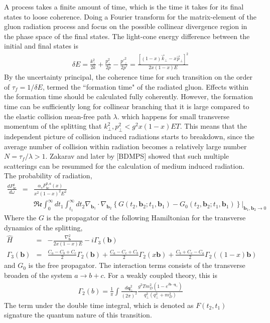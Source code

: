 A process takes a finite amount of time, which is the time it takes for its final states to loose coherence. 
Doing a Fourier transform for the matrix-element of the gluon radiation process and focus on the possible collinear divergence region in the phase space of the final states.
The light-cone energy difference between the initial and final states is 
\begin{eqnarray}
\delta E = \frac{k_\perp^2}{2k} + \frac{p_\perp^2}{2p} - \frac{{p'}_\perp^2}{2{p'}} = \frac{ [(1-x)\vec{k}_\perp - x\vec{p}_\perp]^2}{2x(1-x)E}
\end{eqnarray}
By the uncertainty principal, the coherence time for such transition on the order of $\tau_f = 1/\delta E$, termed the ``formation time" of the radiated gluon. 
Effects within the formation time should be calculated fully coherently.
However, the formation time can be sufficiently long for collinear branching that it is large compared to the elastic collision mean-free path $\lambda$.
which happens for small transverse momentum of the splitting that $k_\perp^2, p_\perp^2 < g^2x(1-x)ET$.
This means that the independent picture of collision induced radiations starts to breakdown, since the average number of collision within radiation becomes a relatively large number $N = \tau_f/\lambda >1$.
Zakarav and later by [BDMPS] showed that such multiple scatterings can be resummed for the calculation of medium induced radiation.
The probability of radiation,
\begin{eqnarray}
\nonumber
\frac{dP^{a}_{bc}}{d\omega} &=& \frac{\alpha_s P^{0,a}_{bc}(x)}{x^2(1-x)^2 E^2}\\
&&\mathfrak{Re}\int_0^\infty dt_1 \int_{t_1}^{\infty} dt_2 \nabla_{\mathbf{b}_1} \cdot\nabla_{\mathbf{b}_2} \left\{G(t_2, \mathbf{b}_2; t_1, \mathbf{b}_1) - G_0(t_2, \mathbf{b}_2; t_1, \mathbf{b}_1) \right\}|_{\mathbf{b}_1, \mathbf{b}_2 \rightarrow 0}
\end{eqnarray}
Where the $G$ is the propagator of the following Hamiltonian for the transverse dynamics of the splitting,
\begin{eqnarray}
\hat{H} &=& - \frac{\nabla^2_{\mathbf{b}}}{2x(1-x)E} - i \Gamma_3(\mathbf{b})\\
\Gamma_3(\mathbf{b}) &=& \frac{C_a-C_b+C_c}{2}\Gamma_2(\mathbf{b}) + \frac{C_a-C_c+C_b}{2}\Gamma_2(x\mathbf{b}) + \frac{C_b+C_c-C_a}{2}\Gamma_2((1-x)\mathbf{b})
\end{eqnarray}
and $G_0$ is the free propagator.
The interaction terms consists of the transverse broaden of the system $a\rightarrow b+c$. 
For a weakly coupled theory, this is
\begin{eqnarray}
\Gamma_2(b) = \frac{1}{\pi}\int \frac{d\mathbf{q}_\perp^2}{(2\pi)^2} \frac{g^2 T m_D^2 (1-e^{i\mathbf{b}\cdot\mathbf{q_\perp}})}{q_\perp^2(q_\perp^2+m_D^2)}
\end{eqnarray}
The term under the double time integral, which is denoted as $F(t_2, t_1)$ signature the quantum nature of this transition. 

